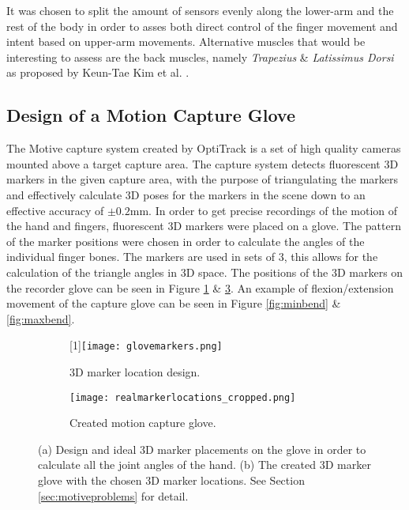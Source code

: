\documentclass[../main.tex]{subfiles}
\begin{document}
It was chosen to split the amount of sensors evenly along the lower-arm and the rest of the body in order to asses both direct control of the finger movement and intent based on upper-arm movements.
Alternative muscles that would be interesting to assess are the back muscles, namely \textit{Trapezius} \& \textit{Latissimus Dorsi} as proposed by Keun-Tae Kim et al. \cite{KeunTaeKim2021}.

\subsection{Design of a Motion Capture Glove}
\label{sec:motiveglove}

The Motive capture system created by OptiTrack \cite{motive} is a set of high quality cameras mounted above a target capture area.
The capture system detects fluorescent 3D markers in the given capture area, with the purpose of triangulating the markers and effectively calculate 3D poses for the markers in the scene down to an effective accuracy of $\pm 0.2$mm.
In order to get precise recordings of the motion of the hand and fingers, fluorescent 3D markers were placed on a glove.
The pattern of the marker positions were chosen in order to calculate the angles of the individual finger bones.
The markers are used in sets of 3, this allows for the calculation of the triangle angles in 3D space.
The positions of the 3D markers on the recorder glove can be seen in Figure \ref{fig:markerdesign} \& \ref{fig:realmarkers}.
An example of \gls{flexion/extension} movement of the capture glove can be seen in Figure \ref{fig:minbend} \& \ref{fig:maxbend}.


\begin{figure}[H]
    \centering
    \begin{subfigure}[b]{0.49\textwidth}
        \centering
        \scalebox{-1}[1]{\texttt{[image: glovemarkers.png]}}
        \caption{3D marker location design.}
        \label{fig:markerdesign}
    \end{subfigure}
    \hfill
    \centering
    \begin{subfigure}[b]{0.49\textwidth}
        \centering
        \texttt{[image: realmarkerlocations\_cropped.png]}
        \caption{Created motion capture glove.}
        \label{fig:realmarkers}
    \end{subfigure}
    \caption{(a) Design and ideal 3D marker placements on the glove in order to calculate all the joint angles of the hand. (b) The created 3D marker glove with the chosen 3D marker locations. See Section \ref{sec:motiveproblems} for detail.}
\end{figure}
\end{document}
